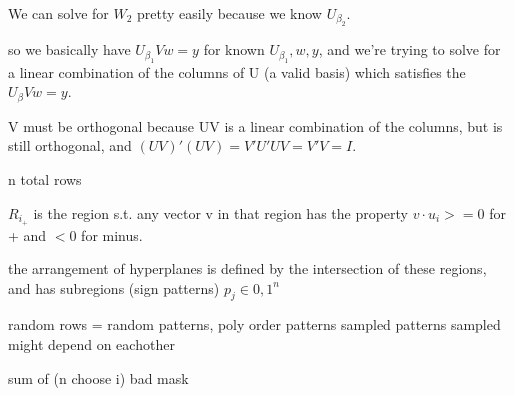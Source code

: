\documentclass[12pt]{article}
\begin{document}
We can solve for $W_2$ pretty easily because we know $U_{\beta_2}$. 


so we basically have $U_{\beta_1}Vw = y$ for known $U_{\beta_1},w,y$, and we're trying to solve for a linear combination of the columns of U (a valid basis) which satisfies the $U_{\beta}Vw = y$. 

V must be orthogonal because UV is a linear combination of the columns, but is still orthogonal, and $(UV)'(UV) = V'U'UV = V'V = I$.






n total rows

$R_{i_+}$ is the region s.t. any vector v in that region has the property $v \cdot u_i >= 0$ for + and $< 0 $ for minus.

the arrangement of hyperplanes is defined by the intersection of these regions, and has subregions (sign patterns) $p_j \in {0,1}^n$

random rows = random patterns, poly order patterns sampled
patterns sampled might depend on eachother

sum of (n choose i) bad mask
\end{document}
